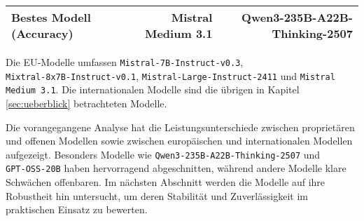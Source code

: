 \begin{table}[htbp]
\begin{adjustbox}{width=\textwidth}
\begin{threeparttable}[width=\textwidth]
\begin{tabular}[width=\textwidth]{l r r}
    Bestes Modell (Accuracy)    & Mistral Medium 3.1          & Qwen3-235B-A22B-Thinking-2507 \\
    \bottomrule
   \end{tabular}
   \begin{tablenotes}
    \footnotesize
    \item Die \ac{EU}‑Modelle umfassen \texttt{Mistral‑7B‑Instruct‑v0.3}, \texttt{Mixtral‑8x7B‑Instruct‑v0.1}, \texttt{Mistral‑Large‑Instruct‑2411} und \texttt{Mistral Medium 3.1}. Die internationalen Modelle sind die übrigen in Kapitel \ref{sec:ueberblick} betrachteten Modelle.
   \end{tablenotes}
  \end{threeparttable}
 \end{adjustbox}
\end{table}

 Die vorangegangene Analyse hat die Leistungsunterschiede zwischen proprietären und offenen Modellen sowie zwischen europäischen und internationalen Modellen aufgezeigt. Besonders Modelle wie \texttt{Qwen3‑235B‑A22B‑Thinking‑2507} und \texttt{GPT‑OSS‑20B} haben hervorragend abgeschnitten, während andere Modelle klare Schwächen offenbaren. Im nächsten Abschnitt werden die Modelle auf ihre Robustheit hin untersucht, um deren Stabilität und Zuverlässigkeit im praktischen Einsatz zu bewerten.